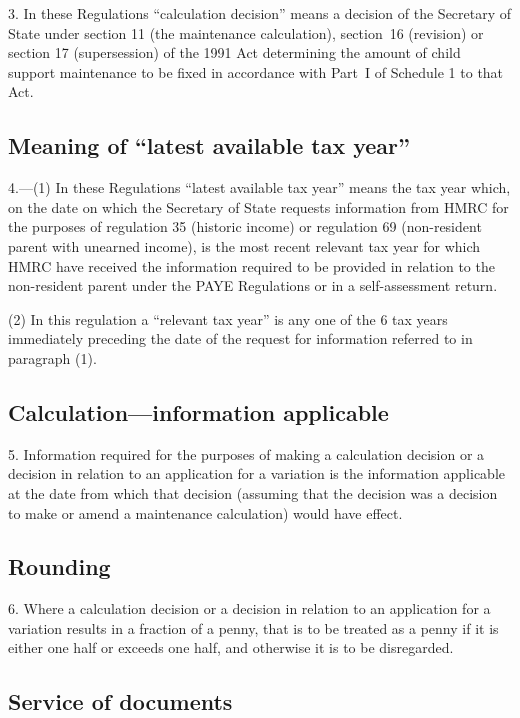 \documentclass[12pt,a4paper]{article}
\begin{document}
3.  In these Regulations “calculation decision” means a decision of the Secretary of State under section 11 (the maintenance calculation), section~16 (revision) or section 17 (supersession) of the 1991 Act determining the amount of child support maintenance to be fixed in accordance with Part~I of Schedule 1 to that Act.

\subsection[4. Meaning of “latest available tax year”]{Meaning of “latest available tax year”}

4.---(1)  In these Regulations “latest available tax year” means the tax year which, on the date on which the Secretary of State requests information from HMRC for the purposes of regulation 35 (historic income) or regulation 69 (non-resident parent with unearned income), is the most recent relevant tax year for which HMRC have received the information required to be provided in relation to the non-resident parent under the PAYE Regulations or in a self-assessment return.

(2) In this regulation a “relevant tax year” is any one of the 6 tax years immediately preceding the date of the request for information referred to in paragraph (1).

\subsection[5. Calculation---information applicable]{Calculation---information applicable}

5.  Information required for the purposes of making a calculation decision or a decision in relation to an application for a variation is the information applicable at the date from which that decision (assuming that the decision was a decision to make or amend a maintenance calculation) would have effect.

\subsection[6. Rounding]{Rounding}

6.  Where a calculation decision or a decision in relation to an application for a variation results in a fraction of a penny, that is to be treated as a penny if it is either one half or exceeds one half, and otherwise it is to be disregarded.

\subsection[7. Service of documents]{Service of documents}
\end{document}
